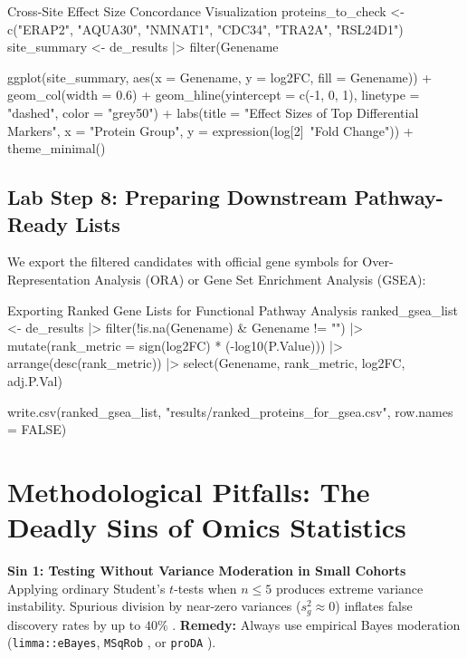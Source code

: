 \documentclass[11pt,twoside,openright]{book}
\begin{document}
\begin{rchunk}{Cross-Site Effect Size Concordance Visualization}
proteins_to_check <- c("ERAP2", "AQUA30", "NMNAT1", "CDC34", "TRA2A", "RSL24D1")
site_summary <- de_results |> 
  filter(Genename %

ggplot(site_summary, aes(x = Genename, y = log2FC, fill = Genename)) +
  geom_col(width = 0.6) +
  geom_hline(yintercept = c(-1, 0, 1), linetype = "dashed", color = "grey50") +
  labs(title = "Effect Sizes of Top Differential Markers",
       x = "Protein Group", y = expression(log[2]~"Fold Change")) +
  theme_minimal()
\end{rchunk}

\subsection{Lab Step 8: Preparing Downstream Pathway-Ready Lists}

We export the filtered candidates with official gene symbols for Over-Representation Analysis (ORA) or Gene Set Enrichment Analysis (GSEA):

\begin{rchunk}{Exporting Ranked Gene Lists for Functional Pathway Analysis}
ranked_gsea_list <- de_results |>
  filter(!is.na(Genename) & Genename != "") |>
  mutate(rank_metric = sign(log2FC) * (-log10(P.Value))) |>
  arrange(desc(rank_metric)) |>
  select(Genename, rank_metric, log2FC, adj.P.Val)

write.csv(ranked_gsea_list, "results/ranked_proteins_for_gsea.csv", row.names = FALSE)
\end{rchunk}

\section{Methodological Pitfalls: The Deadly Sins of Omics Statistics}

\begin{pitfallbox}
\textbf{Sin 1: Testing Without Variance Moderation in Small Cohorts}\\
Applying ordinary Student's $t$-tests when $n \le 5$ produces extreme variance instability. Spurious division by near-zero variances ($s_g^2 \approx 0$) inflates false discovery rates by up to $40\%$ \cite{smyth2004linear}. \textbf{Remedy:} Always use empirical Bayes moderation (\texttt{limma::eBayes}, \texttt{MSqRob} \cite{goeminne2016msqrob2}, or \texttt{proDA} \cite{ahlmann2020proda}).
\end{pitfallbox}
\end{document}
